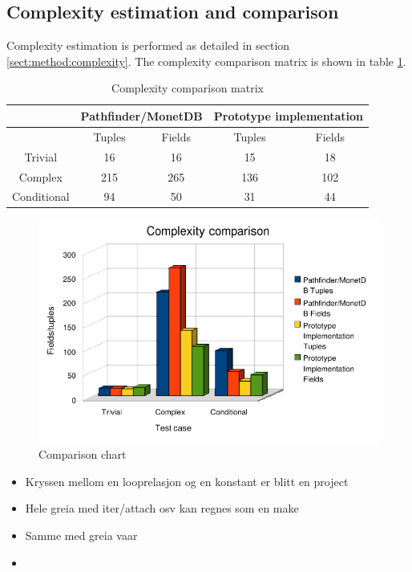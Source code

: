 \subsection{Complexity estimation and comparison}
Complexity estimation is performed as detailed in section
\ref{sect:method:complexity}. The complexity comparison matrix is shown in
table \ref{table:result:complexity_matrix}.

\begin{table}

 \begin{tabular}{| c | c | c || c | c |}
  \hline
   & \multicolumn{2}{|c||}{\textbf{Pathfinder/MonetDB}}
   & \multicolumn{2}{|c|}{\textbf{Prototype implementation}} \\
   \hline
   & Tuples & Fields & Tuples & Fields \\  
   \hline
   \hline   
   Trivial & 16 & 16 & 15 & 18 \\  
   \hline
   Complex & 215 & 265 & 136 & 102 \\  
   \hline
   Conditional & 94 & 50 & 31 & 44 \\  
   \hline
 \end{tabular}
\caption{Complexity comparison matrix}
\label{table:result:complexity_matrix}
\end{table}

\begin{figure}[!htp]
\begin{center}
  \includegraphics[width=1.0\textwidth]{diagrams/comparison_chart}
  \caption{Comparison chart}
  \label{fig:results:comparison:chart}
\end{center}
\end{figure}

\begin{itemize}
  \item Kryssen mellom en looprelasjon og en konstant er blitt en project 
  \item Hele greia med iter/attach osv kan regnes som en make
  \item Samme med greia vaar
  \item 
\end{itemize}

